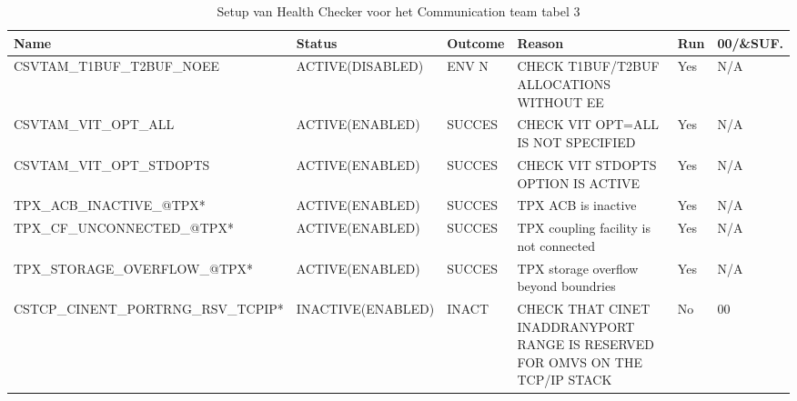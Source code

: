 \begin{landscape}
	\begin{table}[h]
		\begin{tabular}{|l|l|l|p{4.5cm}|l|l|}
			\hline
			\textbf{Name}                       & \textbf{Status}   & \textbf{Outcome} & \textbf{Reason}  & \textbf{Run} & \textbf{00/\&SUF.} \\ \hline
			CSVTAM\_T1BUF\_T2BUF\_NOEE    & ACTIVE(DISABLED) & ENV N  & CHECK T1BUF/T2BUF ALLOCATIONS WITHOUT EE &Yes & N/A \\ \hline
			CSVTAM\_VIT\_OPT\_ALL         & ACTIVE(ENABLED) & SUCCES & CHECK   VIT OPT=ALL IS NOT SPECIFIED     & Yes & N/A \\ \hline
			CSVTAM\_VIT\_OPT\_STDOPTS     & ACTIVE(ENABLED) & SUCCES & CHECK   VIT STDOPTS OPTION IS ACTIVE     & Yes & N/A \\ \hline
			TPX\_ACB\_INACTIVE\_@TPX*     & ACTIVE(ENABLED) & SUCCES & TPX ACB   is inactive                    & Yes & N/A \\ \hline
			TPX\_CF\_UNCONNECTED\_@TPX*   & ACTIVE(ENABLED) & SUCCES & TPX   coupling facility is not connected & Yes & N/A \\ \hline
			TPX\_STORAGE\_OVERFLOW\_@TPX* & ACTIVE(ENABLED) & SUCCES & TPX   storage overflow beyond boundries  & Yes & N/A \\ \hline
			CSTCP\_CINENT\_PORTRNG\_RSV\_TCPIP* & INACTIVE(ENABLED) & INACT            & CHECK   THAT CINET INADDRANYPORT RANGE IS   RESERVED   FOR OMVS ON THE TCP/IP STACK & No & 00  \\ \hline
		\end{tabular}
		\caption[Health Checker Communication team tabel 3]{Setup van Health Checker voor het Communication team tabel 3}
		\label{tbl:Communication Team Tabel 3}
	\end{table}
\end{landscape}

